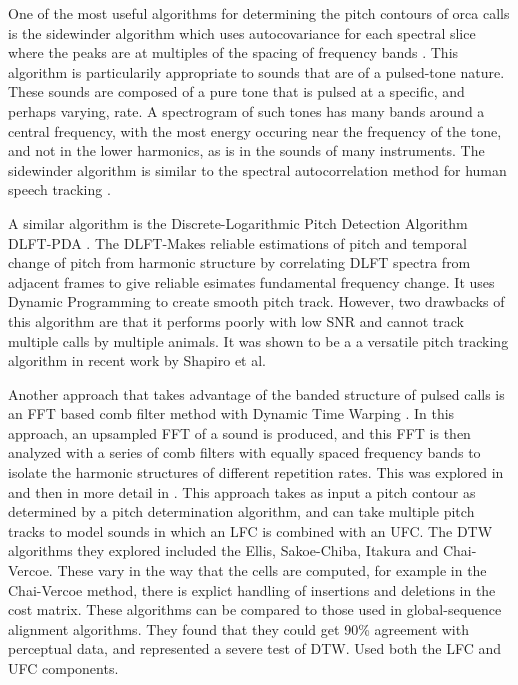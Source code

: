 One of the most useful algorithms for determining the pitch contours
of orca calls is the sidewinder algorithm which uses autocovariance
for each spectral slice where the peaks are at multiples of the
spacing of frequency bands \cite{deeke99}.  This algorithm is
particularily appropriate to sounds that are of a pulsed-tone nature.
These sounds are composed of a pure tone that is pulsed at a specific,
and perhaps varying, rate.  A spectrogram of such tones has many bands
\cite{watkins67} around a central frequency, with the most energy
occuring near the frequency of the tone, and not in the lower
harmonics, as is in the sounds of many instruments.  The sidewinder
algorithm is similar to the spectral autocorrelation method for human
speech tracking \cite{lahat87}.

A similar algorithm is the Discrete-Logarithmic Pitch Detection
Algorithm DLFT-PDA \cite{wang00}.  The DLFT-Makes reliable estimations
of pitch and temporal change of pitch from harmonic structure by
correlating DLFT spectra from adjacent frames to give reliable
esimates fundamental frequency change.  It uses Dynamic Programming to
create smooth pitch track.  However, two drawbacks of this algorithm
are that it performs poorly with low SNR and cannot track multiple
calls by multiple animals.  It was shown to be a a versatile pitch
tracking algorithm in recent work by Shapiro et al. \cite{shapiro09}

Another approach that takes advantage of the banded structure of
pulsed calls is an FFT based comb filter method with Dynamic Time
Warping \cite{brown06}.  In this approach, an upsampled FFT of a sound
is produced, and this FFT is then analyzed with a series of comb
filters with equally spaced frequency bands to isolate the harmonic
structures of different repetition rates. This was explored in
\cite{brown06} and then in more detail in \cite{brown07}.  This
approach takes as input a pitch contour as determined by a pitch
determination algorithm, and can take multiple pitch tracks to model
sounds in which an LFC is combined with an UFC.  The DTW algorithms
they explored included the Ellis, Sakoe-Chiba, Itakura and
Chai-Vercoe.  These vary in the way that the cells are computed, for
example in the Chai-Vercoe method, there is explict handling of
insertions and deletions in the cost matrix.  These algorithms can be
compared to those used in global-sequence alignment algorithms.  They
found that they could get 90\% agreement with perceptual data, and
represented a severe test of DTW.  Used both the LFC and UFC
components.

